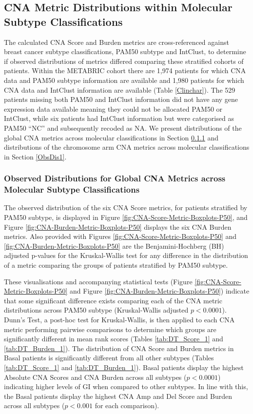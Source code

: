 \subsection{CNA Metric Distributions within Molecular Subtype Classifications}
\label{LGI}
The calculated CNA Score and Burden metrics are cross-referenced against breast cancer subtype classifications, PAM50 subtype and IntClust, to determine if observed distributions of metrics differed comparing these stratified cohorts of patients. Within the METABRIC cohort there are 1,974 patients for which CNA data and PAM50 subtype information are available and 1,980 patients for which CNA data and IntClust information are available (Table \ref{Clinchar}). The 529 patients missing both PAM50 and IntClust information did not have any gene expression data available meaning they could not be allocated PAM50 or IntClust, while six patients had IntClust information but were categorised as PAM50 “NC” and subsequently recoded as NA. We present distributions of the global CNA metrics across molecular classifications in Section \ref{ObsDis} and distributions of the chromosome arm CNA metrics across molecular classifications in Section \ref{ObsDis1}.

\subsubsection{Observed Distributions for Global CNA Metrics across Molecular Subtype Classifications}
\label{ObsDis}
The observed distribution of the six CNA Score metrics, for patients stratified by PAM50 subtype, is displayed in Figure \ref{fig:CNA-Score-Metric-Boxplots-P50}, and Figure \ref{fig:CNA-Burden-Metric-Boxplots-P50} displays the six CNA Burden metrics. Also provided with Figures \ref{fig:CNA-Score-Metric-Boxplots-P50} and \ref{fig:CNA-Burden-Metric-Boxplots-P50} are the Benjamini-Hochberg (BH) adjusted p-values for the Kruskal-Wallis test for any difference in the distribution of a metric comparing the groups of patients stratified by PAM50 subtype. 

These visualisations and accompanying statistical tests (Figure \ref{fig:CNA-Score-Metric-Boxplots-P50} and Figure \ref{fig:CNA-Burden-Metric-Boxplots-P50}) indicate that some significant difference exists comparing each of the CNA metric distributions across PAM50 subtype (Kruskal-Wallis adjusted $p<0.0001$). Dunn's Test, a post-hoc test for Kruskal-Wallis, is then applied to each CNA metric performing pairwise comparisons to determine which groups are significantly different in mean rank scores (Tables \ref{tab:DT_Score_1} and \ref{tab:DT_Burden_1}). The distribution of CNA Score and Burden metrics in Basal patients is significantly different from all other subtypes (Tables \ref{tab:DT_Score_1} and \ref{tab:DT_Burden_1}). Basal patients display the highest Absolute CNA Scores and CNA Burden across all subtypes ($p<0.0001$) indicating higher levels of GI when compared to other subtypes. In line with this, the Basal patients display the highest CNA Amp and Del Score and Burden across all subtypes ($p<0.001$ for each comparison).

